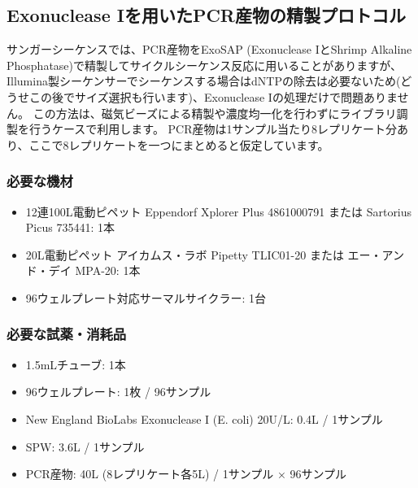 \documentclass[titlepage,10pt,a4paper,uplatex]{jsbook}
\begin{document}
\subsection{Exonuclease Iを用いたPCR産物の精製プロトコル}

サンガーシーケンスでは、PCR産物をExoSAP (Exonuclease IとShrimp Alkaline Phosphatase)で精製してサイクルシーケンス反応に用いることがありますが、Illumina製シーケンサーでシーケンスする場合はdNTPの除去は必要ないため(どうせこの後でサイズ選択も行います)、Exonuclease Iの処理だけで問題ありません。
この方法は、磁気ビーズによる精製や濃度均一化を行わずにライブラリ調製を行うケースで利用します。
PCR産物は1サンプル当たり8レプリケート分あり、ここで8レプリケートを一つにまとめると仮定しています。

\subsubsection{必要な機材}
\begin{itemize}
\item 12連100{\textmu}L電動ピペット Eppendorf Xplorer Plus 4861000791 または Sartorius Picus 735441: 1本
\item 20{\textmu}L電動ピペット アイカムス・ラボ Pipetty TLIC01-20 または エー・アンド・デイ MPA-20: 1本
\item 96ウェルプレート対応サーマルサイクラー: 1台
\end{itemize}

\subsubsection{必要な試薬・消耗品}
\begin{itemize}
\item 1.5mLチューブ: 1本
\item 96ウェルプレート: 1枚 / 96サンプル
\item New England BioLabs Exonuclease I (E. coli) 20U/{\textmu}L: 0.4{\textmu}L / 1サンプル
\item SPW: 3.6{\textmu}L / 1サンプル
\item PCR産物: 40{\textmu}L (8レプリケート各5{\textmu}L) / 1サンプル × 96サンプル
\end{itemize}
\end{document}
